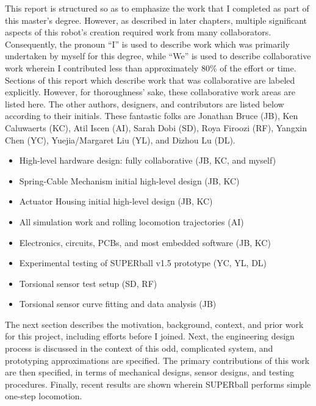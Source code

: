 \documentclass[12pt]{report}
\begin{document}
This report is structured so as to emphasize the work that I completed as part of this master's degree.
However, as described in later chapters, multiple significant aspects of this robot's creation required work from many collaborators.
Consequently, the pronoun ``I'' is used to describe work which was primarily undertaken by myself for this degree, while ``We'' is used to describe collaborative work wherein I contributed less than approximately 80\% of the effort or time.
Sections of this report which describe work that was collaborative are labeled explicitly.
However, for thoroughness' sake, these collaborative work areas are listed here.
The other authors, designers, and contributors are listed below according to their initials.
These fantastic folks are Jonathan Bruce (JB), Ken Caluwaerts (KC), Atil Iscen (AI), Sarah Dobi (SD), Roya Firoozi (RF), Yangxin Chen (YC), Yuejia/Margaret Liu (YL), and Dizhou Lu (DL).

\begin{itemize}
  \setlength{\itemsep}{0cm}%
  \setlength{\parskip}{0cm}%
  \item High-level hardware design: fully collaborative (JB, KC, and myself)
  \item Spring-Cable Mechanism initial high-level design (JB, KC)
  \item Actuator Housing initial high-level design (JB, KC)
  \item All simulation work and rolling locomotion trajectories (AI)
  \item Electronics, circuits, PCBs, and most embedded software (JB, KC)
  \item Experimental testing of SUPERball v1.5 prototype (YC, YL, DL)
  \item Torsional sensor test setup (SD, RF)
  \item Torsional sensor curve fitting and data analysis (JB)
\end{itemize}
 
The next section describes the motivation, background, context, and prior work for this project, including efforts before I joined.
Next, the engineering design process is discussed in the context of this odd, complicated system, and prototyping approximations are specified.
The primary contributions of this work are then specified, in terms of mechanical designs, sensor designs, and testing procedures.
Finally, recent results are shown wherein SUPERball performs simple one-step locomotion.


\end{document}
